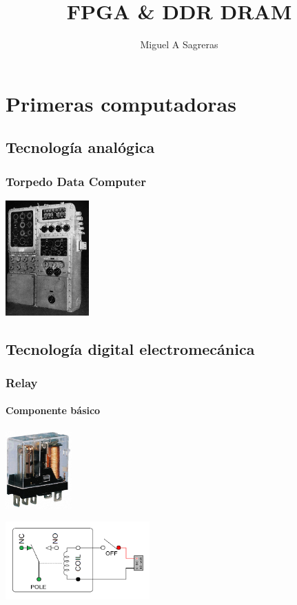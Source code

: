 \documentclass{beamer}
\title{FPGA \& DDR DRAM}
\author[msagre]{Miguel A Sagreras}
\date[2015]{}
\begin{document}
\begin{frame}
\titlepage
\end{frame}

\section{Primeras computadoras}
\subsection{Tecnología analógica}
\begin{frame}
\frametitle{Torpedo Data Computer}
\includegraphics[width=3.2cm]{TDC-image.jpg} 

\end{frame}

\subsection{Tecnología digital electromecánica}

\begin{frame}
\frametitle{Relay}
\framesubtitle{Componente básico}
\begin{minipage}[c]{6cm}
	\begin{center}
		\includegraphics[height=3cm]{relay-imagen.jpg}
	\end{center}
\end{minipage}
\begin{minipage}[c]{5cm}
	\begin{center}
		\includegraphics[height=3cm]{relay-diagrama.png}
	\end{center}
\end{minipage}
\end{frame}
\end{document}
